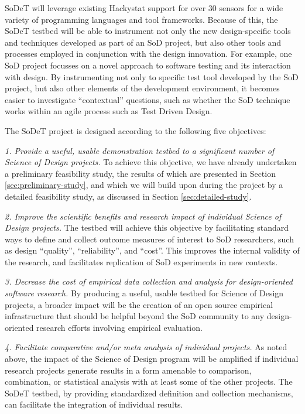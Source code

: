 SoDeT will leverage existing Hackystat support for over 30 sensors for a
wide variety of programming languages and tool frameworks. Because of this,
the SoDeT testbed will be able to instrument not only the new
design-specific tools and techniques developed as part of an SoD project,
but also other tools and processes employed in conjunction with the design
innovation.  For example, one SoD project focusses on a novel approach to
software testing and its interaction with design.  By instrumenting not
only to specific test tool developed by the SoD project, but also other
elements of the development environment, it becomes easier to investigate
``contextual'' questions, such as whether the SoD technique works within an
agile process such as Test Driven Design.

The SoDeT project is designed according to the following five objectives:

{\em 1. Provide a useful, usable demonstration testbed to a significant
number of Science of Design projects.} To achieve this objective, we have
already undertaken a preliminary feasibility study, the results of which are presented in
Section \ref{sec:preliminary-study}, and which we will build upon during the
project by a detailed feasibility study, as discussed in Section
\ref{sec:detailed-study}.

{\em 2. Improve the scientific benefits and research impact of individual
Science of Design projects.} The testbed will achieve this objective by
facilitating standard ways to define and collect outcome measures of interest to SoD
researchers, such as design ``quality'', ``reliability'', and ``cost''.
This improves the internal validity of the research, and facilitates replication
of SoD experiments in new contexts. 

{\em 3. Decrease the cost of empirical data collection and analysis for
design-oriented software research.}  By producing a useful, usable testbed
for Science of Design projects, a broader impact will be the creation of an
open source empirical infrastructure that should be helpful beyond the SoD
community to any design-oriented research efforts involving empirical
evaluation.

{\em 4. Facilitate comparative and/or meta analysis of individual
projects.} As noted above, the impact of the Science of Design program will
be amplified if individual research projects generate results in a form
amenable to comparison, combination, or statistical analysis with at least
some of the other projects.  The SoDeT testbed, by providing standardized
definition and collection mechanisms, can facilitate the integration of
individual results.

